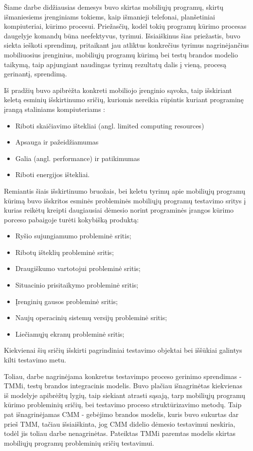 \documentclass{VUMIFPSkursinis}
\begin{document}
 Šiame darbe didžiausias demesys buvo skirtas mobiliųjų programų, skirtų išmaniesiems įrenginiams tokiems, kaip išmanieji telefonai, planšetiniai kompiuteriai, kūrimo procesui. Priežasčių, kodėl tokių programų kūrimo procesas daugelyje komandų būna neefektyvus, tyrimui. Išsiaiškinus šias priežastis, buvo siekta ieškoti sprendimų, pritaikant jau atliktus konkrečius tyrimus nagrinėjančius mobiliuosius įrenginius, mobiliųjų programų kūrimą bei testų brandos modelio taikymą, taip apjungiant naudingas tyrimų rezultatų dalis į vieną, procesą gerinantį, sprendimą.

Iš pradžių buvo apibrėžta konkreti mobiliojo įrenginio sąvoka, taip išskiriant keletą esminių išskirtinumo sričių, kuriomis nereikia rūpintis kuriant programinę įrangą staliniams kompiuteriams \cite{Satyanarayanan:1996:FCM:248052.248053}:
\begin{itemize}
   \item Riboti skaičiavimo ištekliai (angl. limited computing resources)
   \item Apsauga ir pažeidžiamumas
   \item Galia (angl. performance) ir patikimumas
   \item Riboti energijos ištekliai.
\end{itemize}
Remiantis šiais išskirtinumo bruožais, bei keletu tyrimų apie mobiliųjų programų kūrimą \cite{Muccini:2012:STM:2663608.2663615, 6496451} buvo išskritos esminės probleminės mobiliųjų programų testavimo sritys į kurias reikėtų kreipti daugiausiai dėmesio norint programinės įrangos kūrimo porceso pabaigoje turėti kokybišką produktą:
\begin{itemize}
  \item Ryšio sujungiamumo probleminė sritis;
  \item Ribotų išteklių probleminė sritis;
  \item Draugiškumo vartotojui probleminė sritis;
  \item Situacinio prisitaikymo probleminė sritis;
  \item Įrenginių gausos probleminė sritis;
  \item Naujų operacinių sistemų versijų probleminė sritis;
  \item Liečiamųjų ekranų probleminė sritis;
\end{itemize}
Kiekvienai šių sričių išskirti pagrindiniai testavimo objektai bei iššūkiai galintys kilti testavimo metu.

Toliau, darbe nagrinėjama konkretus testavimpo proceso gerinimo sprendimas - TMMi, testų brandos integracinis modelis. Buvo plačiau išnagrinėtas kiekvienas iš modelyje apibrėžtų lygių, taip siekiant atrasti sąsają, tarp mobiliųjų programų kūrimo probleminių sričių, bei testavimo proceso struktūrizavimo metodų. Taip pat išnagrinėjamas CMM - gebėjimo brandos modelis, kuris buvo sukurtas dar prieš TMM, tačiau išsiaiškinta, jog CMM didelio dėmesio testavimui neskiria, todėl jis toliau darbe nenagrinėtas. Pateiktas TMMi paremtas modelis skirtas mobiliųjų programų probleminių sričių testavimui.
\end{document}
